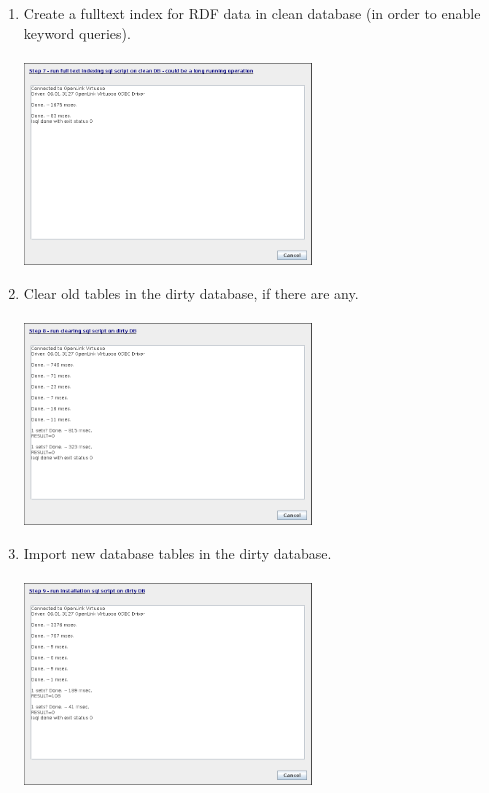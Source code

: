 \begin{enumerate}
\begin{enumerate}
            \item Create a fulltext index for RDF data in clean database (in order to enable keyword queries). 
                    \\\\ \includegraphics[width=0.6\textwidth]{images/install-step-07.png}
            \item Clear old tables in the dirty database, if there are any.
                    \\\\ \includegraphics[width=0.6\textwidth]{images/install-step-08.png}
            \item Import new database tables in the dirty database.
                    \\\\ \includegraphics[width=0.6\textwidth]{images/install-step-09.png}
        \end{enumerate}

\end{enumerate}
